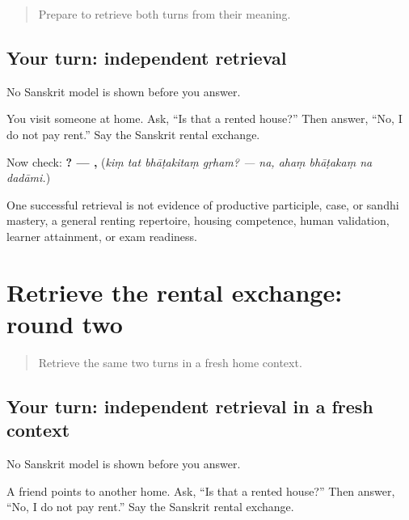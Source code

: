 \label{lesson:SA-C274-rental-first-retrieval}



\begin{quote}
Prepare to retrieve both turns from their meaning.
\end{quote}

\subsection*{Your turn: independent retrieval}
No Sanskrit model is shown before you answer.

You visit someone at home. Ask, “Is that a rented house?” Then answer, “No, I do not pay rent.” Say the Sanskrit rental exchange.

\begin{grammarlens}[title={What you've built: check after answering}]
Now check: \textbf{   ? — ,    } (\emph{kiṃ tat bhāṭakitaṃ gṛham? — na, ahaṃ bhāṭakaṃ na dadāmi.})
\end{grammarlens}

\begin{tcolorbox}[breakable,colback=teal!4,colframe=teal!35!black,title={Before you move on}]
One successful retrieval is not evidence of productive participle, case, or sandhi mastery, a general renting repertoire, housing competence, human validation, learner attainment, or exam readiness.
\end{tcolorbox}
\section[(independent rental-exchange …]{Retrieve the rental exchange: round two}

\label{lesson:SA-C274-rental-final-retrieval}



\begin{quote}
Retrieve the same two turns in a fresh home context.
\end{quote}

\subsection*{Your turn: independent retrieval in a fresh context}
No Sanskrit model is shown before you answer.

A friend points to another home. Ask, “Is that a rented house?” Then answer, “No, I do not pay rent.” Say the Sanskrit rental exchange.

